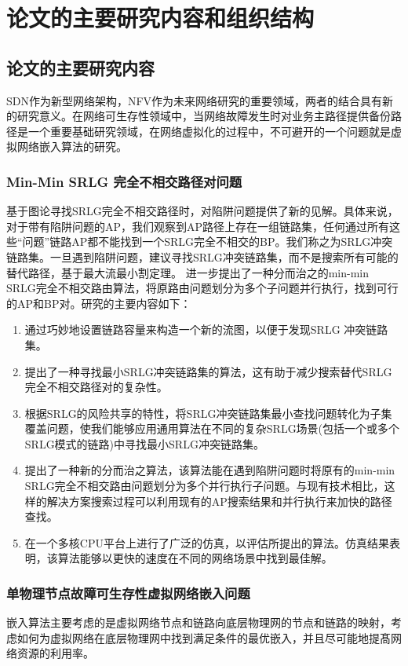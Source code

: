 \section{论文的主要研究内容和组织结构}
\subsection{论文的主要研究内容}
SDN作为新型网络架构，NFV作为未来网络研究的重要领域，两者的结合具有新的研究意义。在网络可生存性领域中，当网络故障发生时对业务主路径提供备份路径是一个重要基础研究领域，在网络虚拟化的过程中，不可避开的一个问题就是虚拟网络嵌入算法的研究。
\subsubsection{Min-Min SRLG 完全不相交路径对问题}
基于图论寻找SRLG完全不相交路径时，对陷阱问题提供了新的见解。具体来说，对于带有陷阱问题的AP，我们观察到AP路径上存在一组链路集，任何通过所有这些“问题”链路AP都不能找到一个SRLG完全不相交的BP。我们称之为SRLG冲突链路集。一旦遇到陷阱问题，建议寻找SRLG冲突链路集，而不是搜索所有可能的替代路径，基于最大流最小割定理\cite{ford2015flows}。 进一步提出了一种分而治之的min-min SRLG完全不相交路由算法，将原路由问题划分为多个子问题并行执行，找到可行的AP和BP对。研究的主要内容如下：
\begin{enumerate}
  \item 通过巧妙地设置链路容量来构造一个新的流图，以便于发现SRLG 冲突链路集。
  \item 提出了一种寻找最小SRLG冲突链路集的算法，这有助于减少搜索替代SRLG完全不相交路径对的复杂性。
  \item 根据SRLG的风险共享的特性，将SRLG冲突链路集最小查找问题转化为子集覆盖问题，使我们能够应用通用算法在不同的复杂SRLG场景(包括一个或多个SRLG模式的链路)中寻找最小SRLG冲突链路集。
  \item 提出了一种新的分而治之算法，该算法能在遇到陷阱问题时将原有的min-min SRLG完全不相交路由问题划分为多个并行执行子问题。与现有技术相比，这样的解决方案搜索过程可以利用现有的AP搜索结果和并行执行来加快的路径查找。
  \item 在一个多核CPU平台上进行了广泛的仿真，以评估所提出的算法。仿真结果表明，该算法能够以更快的速度在不同的网络场景中找到最佳解。
\end{enumerate}

\subsubsection{单物理节点故障可生存性虚拟网络嵌入问题}
嵌入算法主要考虑的是虚拟网络节点和链路向底层物理网的节点和链路的映射，考虑如何为虚拟网络在底层物理网中找到满足条件的最优嵌入，并且尽可能地提髙网络资源的利用率。%

